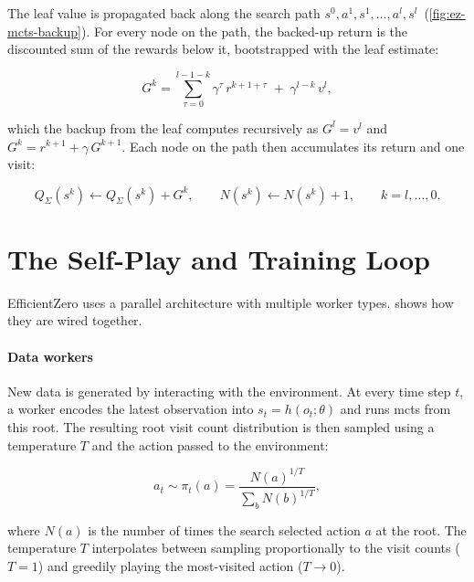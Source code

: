 The leaf value is propagated back along the search path
$s^0, a^1, s^1, \dots, a^l, s^l$~(\cref{fig:ez-mcts-backup}).
For every node on the path, the backed-up return is the discounted sum of the
rewards below it, bootstrapped with the leaf estimate:

\begin{equation}\label{eq:ez-backup}
  G^k=\sum_{\tau=0}^{l-1-k}\gamma^{\tau}\,r^{k+1+\tau}\;+\;\gamma^{l-k}\,v^l,
\end{equation}

which the backup from the leaf computes recursively as $G^l=v^l$ and
$G^k=r^{k+1}+\gamma\,G^{k+1}$.
Each node on the path then accumulates its return and one visit:

\begin{equation}\label{eq:ez-backup-update}
  Q_\Sigma(s^k) \leftarrow Q_\Sigma(s^k)+G^k,
  \qquad
  N(s^k) \leftarrow N(s^k)+1,
  \qquad k=l,\dots,0.
\end{equation}

\section{The Self-Play and Training Loop}\label{sec:ez-loop}

EfficientZero uses a parallel architecture with multiple worker types.
 shows how they are wired together.



\paragraph{Data workers}

New data is generated by interacting with the environment.
At every time step $t$, a worker encodes the latest observation into
$s_t = h(o_t;\theta)$ and runs \gls{mcts} from this root.
The resulting root visit count distribution is then sampled using a temperature
$T$ and the action passed to the environment:

\begin{equation}\label{eq:ez-visit-policy}
  a_t\sim\pi_t(a)=\frac{N(a)^{1/T}}{\sum_b N(b)^{1/T}},
\end{equation}

where $N(a)$ is the number of times the search selected action $a$ at the
root.
The temperature $T$ interpolates between sampling proportionally to the visit
counts ($T=1$) and greedily playing the most-visited action
($T\rightarrow 0$).

